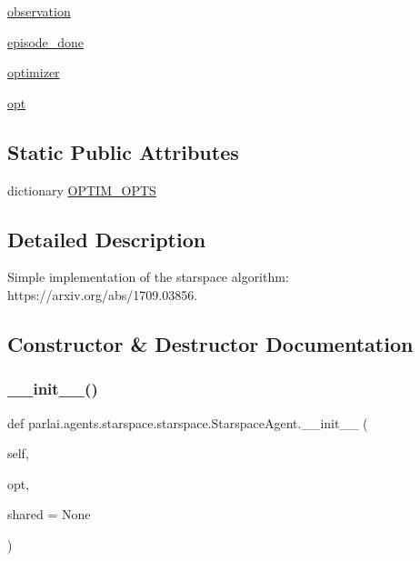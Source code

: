 \begin{DoxyCompactItemize}
\item 
\hyperlink{classparlai_1_1agents_1_1starspace_1_1starspace_1_1StarspaceAgent_a0ec7b24305a7ca5f0fd5a11cd6aa1fdc}{observation}
\item 
\hyperlink{classparlai_1_1agents_1_1starspace_1_1starspace_1_1StarspaceAgent_ad6565ef570b709afb46bf9a9b4bc59c3}{episode\+\_\+done}
\item 
\hyperlink{classparlai_1_1agents_1_1starspace_1_1starspace_1_1StarspaceAgent_afacbbd91785631f9b23fd0fbd9b4cc21}{optimizer}
\item 
\hyperlink{classparlai_1_1agents_1_1starspace_1_1starspace_1_1StarspaceAgent_aae476e9cdd8b9672ae6c28ef9400f09e}{opt}
\end{DoxyCompactItemize}
\subsection*{Static Public Attributes}
\begin{DoxyCompactItemize}
\item 
dictionary \hyperlink{classparlai_1_1agents_1_1starspace_1_1starspace_1_1StarspaceAgent_ab9c156709a8072a6cddf7216396f610a}{O\+P\+T\+I\+M\+\_\+\+O\+P\+TS}
\end{DoxyCompactItemize}


\subsection{Detailed Description}
\begin{DoxyVerb}Simple implementation of the starspace algorithm: https://arxiv.org/abs/1709.03856.
\end{DoxyVerb}
 

\subsection{Constructor \& Destructor Documentation}
\mbox{\label{classparlai_1_1agents_1_1starspace_1_1starspace_1_1StarspaceAgent_a6bdc1142c021946ee6cb409d4f9dc3c9}} 
\subsubsection{\texorpdfstring{\+\_\+\+\_\+init\+\_\+\+\_\+()}{\_\_init\_\_()}}
{\footnotesize\ttfamily def parlai.\+agents.\+starspace.\+starspace.\+Starspace\+Agent.\+\_\+\+\_\+init\+\_\+\+\_\+ (\begin{DoxyParamCaption}\item[{}]{self,  }\item[{}]{opt,  }\item[{}]{shared = {\ttfamily None} }\end{DoxyParamCaption})}

